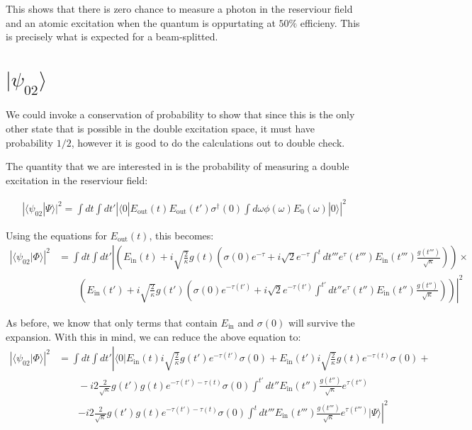 \documentclass[12pt]{article}
\begin{document}
This shows that there is zero chance to measure a photon in the reserviour field and an atomic excitation when the quantum is oppurtating at $50\%$ efficieny. This is precisely what is expected for a beam-splitted.

\section{$| \psi_{02} \rangle $}

We could invoke a conservation of probability to show that since this is the only other state that is possible in the double excitation space, it must have probability $1/2$, however it is good to do the calculations out to double check.

The quantity that we are interested in is the probability of measuring a double excitation in the reserviour field:

\begin{align}
|\langle \psi_{02} | \Psi \rangle |^2 =\int dt \int dt' \left | \langle 0 | E_\textrm{out}(t) E_\textrm{out}(t') \sigma^\dagger(0) \int d \omega \phi(\omega) E_0(\omega) | 0 \rangle \right |^2
\end{align}

Using the equations for $E_\textrm{out}(t)$, this becomes:
\begin{align}
\left | \langle \psi_{02} | \Phi \rangle \right | ^2 & =\int dt \int dt'\left | \left (E_\textrm{in}(t) 
+ i \sqrt{\frac{2}{\kappa}} g(t)\left ( \sigma(0) e^{-\tau} +
i\sqrt{2} e^{-\tau} \int^t d t''' e^\tau(t''') E_\textrm{in}(t''') \frac{g(t''')}{\sqrt{\kappa}} \right ) \right) \right .\times \\
 &\qquad \left. \left (E_\textrm{in}(t') + i \sqrt{\frac{2}{\kappa}} g(t')\left( \sigma(0) e^{-\tau(t')} +
 i\sqrt{2} e^{-\tau(t')} \int^{t'} d t'' e^\tau(t'') E_\textrm{in}(t'') \frac{g(t'')}{\sqrt{\kappa}}\right ) \right ) \right |^2
\end{align}

 
 As before, we know that only terms that contain $E_\textrm{in}$ and $\sigma(0)$ will survive the expansion. With this in 
 mind, we can reduce the above equation to:
\begin{align}
 \left | \langle \psi_{02} | \Phi \rangle \right | ^2 & =\int dt \int dt'\left |\langle 0 | E_\textrm{in}(t) i \sqrt{\frac{2}{\kappa}} g(t') e^{-\tau(t')}\sigma(0) + E_\textrm{in}(t') i \sqrt{\frac{2}{\kappa}} g(t) e^{-\tau(t)}\sigma(0) +\right.\\
&\qquad -i2\frac{2}{\sqrt{\kappa}}g(t')g(t) e^{-\tau(t')-\tau(t)}\sigma(0) \int ^{t'} dt'' E_\textrm{in}(t'')\frac{g(t'')}{\sqrt{\kappa}} e^{\tau(t'')}\\
&\qquad \left. -i2\frac{2}{\sqrt{\kappa}}g(t')g(t) e^{-\tau(t')-\tau(t)}\sigma(0) \int ^t dt''' E_\textrm{in}(t''')\frac{g(t''')}{\sqrt{\kappa}} e^{\tau(t''')}| \Psi \rangle\right |^2
 \end{align}
 
\end{document}
